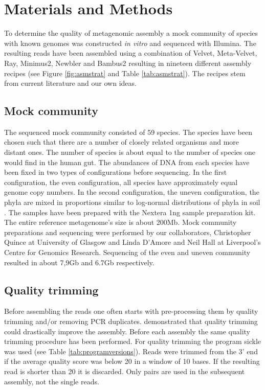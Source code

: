

\section*{Materials and Methods}
To determine the quality of metagenomic assembly a mock
community of species with known genomes was constructed {\em in vitro} and
sequenced with Illumina. The resulting reads have been assembled using a
combination of Velvet, Meta-Velvet, Ray, Minimus2, Newbler and Bambus2 resulting in
nineteen different assembly recipes (see Figure \ref{fig:asmstrat} and Table
\ref{tab:asmstrat}). The recipes stem from current literature and our own
ideas.

\subsection*{Mock community} The sequenced mock community consisted of 59
species. The species have been chosen such that there are a number of closely
related organisms and more distant ones. The number of species is about equal
to the number of species one would find in the human gut. The abundances of DNA
from each species have been fixed in two types of configurations before
sequencing. In the first configuration, the even configuration, all species
have approximately equal genome copy numbers. In the second configuration, the
uneven configuration, the phyla are mixed in proportions similar to log-normal
distributions of phyla in soil \cite{Doroghazi18682841}. The samples have been
prepared with the Nextera 1ng sample preparation kit. The entire reference
metagenome's size is about 200Mb. Mock community preparations and sequencing
were performed by our collaborators, Christopher Quince at University of
Glasgow and Linda D'Amore and Neil Hall at Liverpool's Centre for Genomics
Research. Sequencing of the even and uneven community resulted in about 7,9Gb
and 6.7Gb respectively.

\subsection*{Quality trimming} Before assembling the reads one often starts with
pre-processing them by quality trimming and/or removing PCR duplicates.
\cite{Mende22384016} demonstrated that quality trimming could drastically
improve the assembly. Before each assembly the same quality trimming procedure
has been performed. For quality trimming the program sickle was used (see Table
\ref{tab:programversions}). Reads were trimmed from the 3' end if the average
quality score was below 20 in a window of 10 bases. If the resulting read is
shorter than 20 it is discarded. Only pairs are used in the subsequent
assembly, not the single reads.


